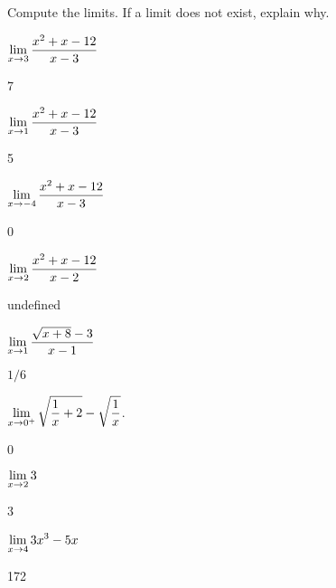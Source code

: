 \begin{exercises}

\noindent Compute the limits. If a limit does not exist, explain why.

\twocol

\begin{exercise} $\displaystyle \lim_{x\to 3}{x^2+x-12\over x-3}$
\begin{answer} 7
\end{answer}\end{exercise}

\begin{exercise} $\displaystyle \lim_{x\to 1}{x^2+x-12\over x-3}$
\begin{answer} 5
\end{answer}\end{exercise}

\begin{exercise} $\displaystyle \lim_{x\to -4}{x^2+x-12\over x-3}$
\begin{answer} 0
\end{answer}\end{exercise}

\begin{exercise} $\displaystyle \lim_{x\to 2} {x^2+x-12\over x-2}$
\begin{answer} undefined
\end{answer}\end{exercise}

\begin{exercise} $\displaystyle \lim_{x\to 1} {\sqrt{x+8}-3\over x-1}$
\begin{answer} $1/6$
\end{answer}\end{exercise}

\begin{exercise} $\displaystyle \lim_{x\to 0^+} \sqrt{{1\over x}+2} - \sqrt{1\over x}$.
\begin{answer} 0
\end{answer}\end{exercise}

\begin{exercise} $\displaystyle\lim _{x\to 2} 3$
\begin{answer} 3
\end{answer}\end{exercise}

\begin{exercise} $\displaystyle\lim _{x\to 4 } 3x^3 - 5x $
\begin{answer} 172
\end{answer}\end{exercise}


\end{exercises}
